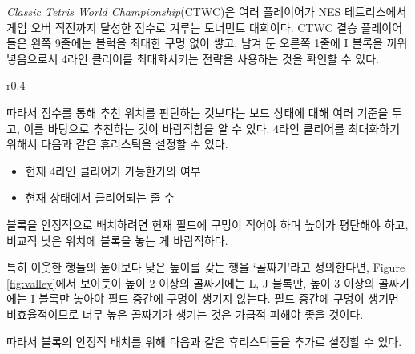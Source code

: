 \textit{Classic Tetris World Championship}(CTWC)은 여러 플레이어가 NES 테트리스에서
게임 오버 직전까지 달성한 점수로 겨루는 토너먼트 대회이다. CTWC 결승 플레이어들은 왼쪽 9줄에는 블럭을 최대한 구멍 없이 쌓고, 남겨 둔 오른쪽 1줄에 I 블록을 끼워넣음으로서
4라인 클리어를 최대화시키는 전략을 사용하는 것을 확인할 수 있다.\cite{CTWC}

\begin{wrapfigure}{r}{0.4\textwidth}
    \caption{깊이 2의 골짜기}
    \label{fig:valley}
\end{wrapfigure}

    
따라서 점수를 통해 추천 위치를 판단하는 것보다는 보드 상태에 대해 여러 기준을 두고, 이를 바탕으로 추천하는 것이 바람직함을 알 수 있다. 4라인 클리어를 최대화하기
위해서 다음과 같은 휴리스틱을 설정할 수 있다.

\begin{itemize}
    \item 현재 4라인 클리어가 가능한가의 여부
    \item 현재 상태에서 클리어되는 줄 수
\end{itemize}

블록을 안정적으로 배치하려면 현재 필드에 구멍이 적어야 하며 높이가 평탄해야 하고, 비교적 낮은 위치에 블록을
놓는 게 바람직하다.

특히 이웃한 행들의 높이보다 낮은 높이를 갖는 행을 `골짜기'라고 정의한다면,
Figure \ref{fig:valley}에서 보이듯이 높이 2 이상의 골짜기에는 L, J 블록만, 높이 3 이상의 골짜기에는
I 블록만 놓아야 필드 중간에 구멍이 생기지 않는다.
필드 중간에 구멍이 생기면 비효율적이므로 너무 높은 골짜기가 생기는 것은 가급적 피해야 좋을 것이다.

따라서 블록의 안정적 배치를 위해 다음과 같은 휴리스틱들을 추가로 설정할 수 있다.

